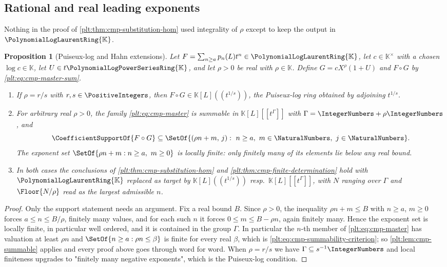 \documentclass[11pt,oneside]{article}
\theoremstyle{plain}
\newtheorem{proposition}[theorem]{Proposition}
\theoremstyle{definition}
\theoremstyle{remark}
\newcommand{\K}{\mathbb{K}}
\newcommand{\PLpow}{\PolynomialLogPowerSeriesRing{\K}}   %
\newcommand{\PLlau}{\PolynomialLogLaurentRing{\K}}       %
\newcommand{\compose}{\mathbin{\circ}}
\begin{document}
\subsection{Rational and real leading exponents}
\label{plt:sec:cmp-fractional}

Nothing in the proof of \cref{plt:thm:cmp-substitution-hom} used integrality of
\(\rho\) except to keep the output in \(\PLlau\).

\begin{proposition}[Puiseux-log and Hahn extensions]
\label{plt:prop:cmp-fractional-rho}
Let \(F=\sum_{n\ge a}p_n(L)t^n\in\PLlau\), let \(c\in\K^\times\) with a chosen
\(\log c\in\K\), let \(U\in t\PLpow\), and let \(\rho>0\) be real with
\(\rho\in\K\).  Define \(G=cX^{\rho}(1+U)\) and \(F\compose G\) by
\eqref{plt:eq:cmp-master-sum}.
\begin{enumerate}
\item If \(\rho=r/s\) with \(r,s\in\PositiveIntegers\), then
\(F\compose G\in\K[L]((t^{1/s}))\), the Puiseux-log ring obtained by adjoining
\(t^{1/s}\).
\item For arbitrary real \(\rho>0\), the family
\eqref{plt:eq:cmp-master} is summable in
\(\K[L][[t^{\Gamma}]]\) with
\(\Gamma=\IntegerNumbers+\rho\IntegerNumbers\), and
\[
 \CoefficientSupportOf{F\compose G}
 \subseteq
 \SetOf{(\rho n+m,\,j):\ n\ge a,\ m\in\NaturalNumbers,\ j\in\NaturalNumbers}.
\]
The exponent set \(\SetOf{\rho n+m:n\ge a,\ m\ge0}\) is locally finite: only
finitely many of its elements lie below any real bound.
\item In both cases the conclusions of
\cref{plt:thm:cmp-substitution-hom} and
\cref{plt:thm:cmp-finite-determination} hold with \(\PLlau\) replaced as
target by \(\K[L]((t^{1/s}))\) resp.\ \(\K[L][[t^{\Gamma}]]\), with \(N\)
ranging over \(\Gamma\) and \(\Floor{N/\rho}\) read as the largest admissible
\(n\).
\end{enumerate}
\end{proposition}

\begin{proof}
Only the support statement needs an argument.  Fix a real bound \(B\).  Since
\(\rho>0\), the inequality \(\rho n+m\le B\) with \(n\ge a\), \(m\ge0\) forces
\(a\le n\le B/\rho\), finitely many values, and for each such \(n\) it
forces \(0\le m\le B-\rho n\), again finitely many.  Hence the exponent set is
locally finite, in particular well ordered, and it is contained in the group
\(\Gamma\).  In particular the \(n\)-th member of \eqref{plt:eq:cmp-master}
has valuation at least \(\rho n\) and
\(\SetOf{n\ge a:\rho n\le\beta}\) is finite for every real \(\beta\), which is
\eqref{plt:eq:cmp-summability-criterion};
so \cref{plt:lem:cmp-summable} applies and every proof above goes through
word for word.  When \(\rho=r/s\) we have
\(\Gamma\subseteq s^{-1}\IntegerNumbers\) and local finiteness upgrades to
"finitely many negative exponents", which is the Puiseux-log condition.
\end{proof}
\end{document}

